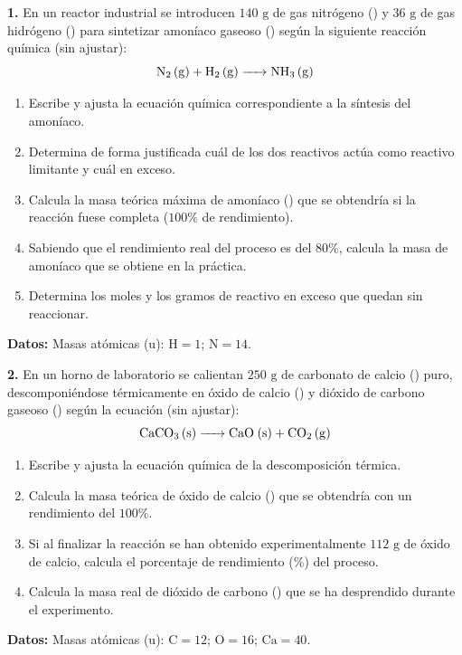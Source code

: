 ﻿\documentclass[11pt,a4paper]{article}
\begin{document}
\pagestyle{empty}

\noindent\textbf{1.} En un reactor industrial se introducen $140\text{ g}$ de gas nitrógeno () y $36\text{ g}$ de gas hidrógeno () para sintetizar amoníaco gaseoso () según la siguiente reacción química (sin ajustar):
\[
\ce{N2 (g) + H2 (g) -> NH3 (g)}
\]

\begin{enumerate}[label=\textbf{\alph*)}, leftmargin=2em, itemsep=4pt]
    \item Escribe y ajusta la ecuación química correspondiente a la síntesis del amoníaco.
    \item Determina de forma justificada cuál de los dos reactivos actúa como reactivo limitante y cuál en exceso.
    \item Calcula la masa teórica máxima de amoníaco () que se obtendría si la reacción fuese completa ($100\%$ de rendimiento).
    \item Sabiendo que el rendimiento real del proceso es del $80\%$, calcula la masa de amoníaco que se obtiene en la práctica.
    \item Determina los moles y los gramos de reactivo en exceso que quedan sin reaccionar.
\end{enumerate}

\vspace{0.25cm}
\noindent\textbf{Datos:} Masas atómicas ($\text{u}$): $\mathrm{H} = 1$; $\mathrm{N} = 14$.

\vspace{0.6cm}

\noindent\textbf{2.} En un horno de laboratorio se calientan $250\text{ g}$ de carbonato de calcio () puro, descomponiéndose térmicamente en óxido de calcio () y dióxido de carbono gaseoso () según la ecuación (sin ajustar):
\[
\ce{CaCO3 (s) -> CaO (s) + CO2 (g)}
\]

\begin{enumerate}[label=\textbf{\alph*)}, leftmargin=2em, itemsep=4pt]
    \item Escribe y ajusta la ecuación química de la descomposición térmica.
    \item Calcula la masa teórica de óxido de calcio () que se obtendría con un rendimiento del $100\%$.
    \item Si al finalizar la reacción se han obtenido experimentalmente $112\text{ g}$ de óxido de calcio, calcula el porcentaje de rendimiento ($\%$) del proceso.
    \item Calcula la masa real de dióxido de carbono () que se ha desprendido durante el experimento.
\end{enumerate}

\vspace{0.25cm}
\noindent\textbf{Datos:} Masas atómicas ($\text{u}$): $\mathrm{C} = 12$; $\mathrm{O} = 16$; $\mathrm{Ca} = 40$.
\end{document}
